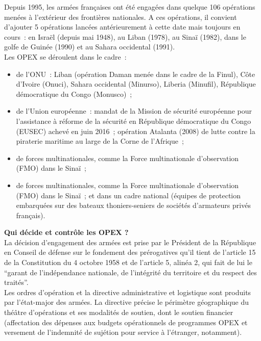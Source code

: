 \documentclass[8pt]{article}
\begin{document}
Depuis 1995, les armées françaises ont été engagées dans quelque 106 opérations menées à l’extérieur des frontières nationales. A ces opérations, il convient d’ajouter 5 opérations lancées antérieurement à cette date mais toujours en cours~: en Israël (depuis mai 1948), au Liban (1978), au Sinaï (1982), dans le golfe de Guinée (1990) et au Sahara occidental (1991).\\

Les OPEX se déroulent dans le cadre~:

\begin{itemize}
	\setlength\itemsep{-0.25em}
	\item de l’ONU~: Liban (opération Daman menée dans le cadre de la Finul), Côte d’Ivoire (Onuci), Sahara occidental (Minurso), Liberia (Minufil), République démocratique du Congo (Monusco)~;
	\item de l’Union européenne~: mandat de la Mission de sécurité européenne pour l’assistance à réforme de la sécurité en République démocratique du Congo (EUSEC) achevé en juin 2016~; opération Atalanta (2008) de lutte contre la piraterie maritime au large de la Corne de l’Afrique~;
	\item de forces multinationales, comme la Force multinationale d’observation (FMO) dans le Sinaï~;
	\item de forces multinationales, comme la Force multinationale d’observation (FMO) dans le Sinaï~;
	et dans un cadre national (équipes de protection embarquées sur des bateaux thoniers-seniers de sociétés d’armateurs privés français).
\end{itemize}


\textbf{Qui décide et contrôle les OPEX ?}\\

La décision d’engagement des armées est prise par le Président de la République en Conseil de défense sur le fondement des prérogatives qu’il tient de l’article 15 de la Constitution du 4 octobre 1958 et de l’article 5, alinéa 2, qui fait de lui le “garant de l’indépendance nationale, de l’intégrité du territoire et du respect des traités”.\\

Les ordres d’opération et la directive administrative et logistique sont produits par l’état-major des armées. La directive précise le périmètre géographique du théâtre d’opérations et ses modalités de soutien, dont le soutien financier (affectation des dépenses aux budgets opérationnels de programmes OPEX et versement de l’indemnité de sujétion pour service à l’étranger, notamment).\\
\end{document}
